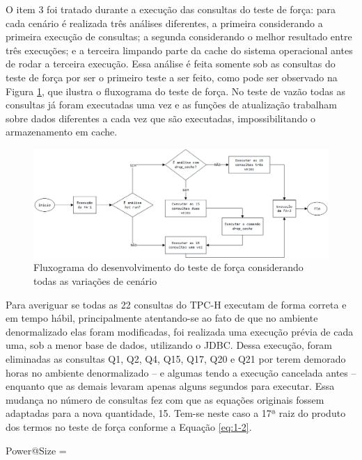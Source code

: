 O item 3 foi tratado durante a execução das consultas do teste de força: para cada cenário é realizada três 
análises diferentes, a primeira considerando a primeira execução de consultas; a segunda considerando o melhor 
resultado entre três execuções; e a terceira limpando parte da cache do sistema operacional antes de 
rodar a terceira execução. Essa análise é feita somente sob as consultas do teste de força por ser o primeiro 
teste a ser feito, como pode ser observado na Figura \ref{fig:power_flux}, que ilustra o fluxograma do teste de força. No teste de vazão todas as consultas já foram executadas 
uma vez e as funções de atualização trabalham sobre dados diferentes a cada vez que são executadas, impossibilitando 
o armazenamento em cache.

\begin{figure}[htpb]
	\centering
        \includegraphics[width=\textwidth]{power_flux}
	\caption{Fluxograma do desenvolvimento do teste de força considerando todas as variações de cenário}
	\label{fig:power_flux}
\end{figure}

Para averiguar se todas as 22 consultas do TPC-H executam de forma correta e em tempo hábil, principalmente 
atentando-se ao fato de que no ambiente denormalizado elas foram modificadas, foi realizada uma execução 
prévia de cada uma, sob a menor base de dados, utilizando o JDBC. Dessa execução, foram eliminadas as consultas 
Q1, Q2, Q4, Q15, Q17, Q20 e Q21 por terem demorado horas no ambiente denormalizado -- e algumas tendo a execução 
cancelada antes -- enquanto que as demais levaram apenas alguns segundos para executar. Essa mudança no número 
de consultas fez com que as equações originais fossem adaptadas para a nova quantidade, 15. Tem-se neste caso a 17ª raiz do produto dos termos no teste de força conforme a Equação \ref{eq:1-2}.

\begin{myequation}%
\label{eq:1-2}
{\scriptstyle Power@Size} =  %
\end{myequation}
%


